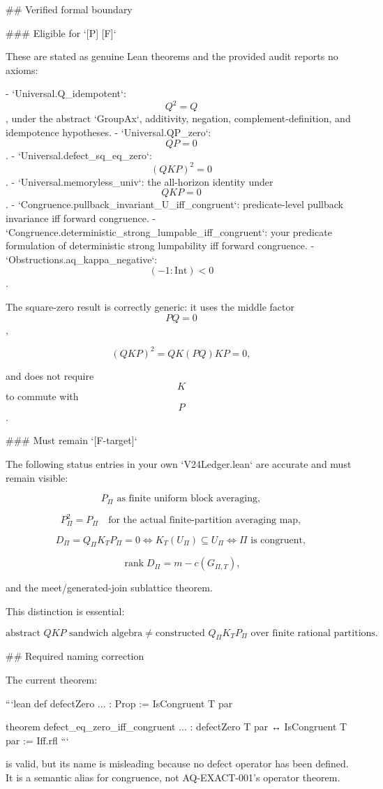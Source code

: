 ## Verified formal boundary

### Eligible for `[P] [F]`

These are stated as genuine Lean theorems and the provided audit reports no axioms:

- `Universal.Q_idempotent`: $$Q^2=Q$$, under the abstract `GroupAx`, additivity, negation, complement-definition, and idempotence hypotheses.
- `Universal.QP_zero`: $$QP=0$$.
- `Universal.defect_sq_eq_zero`: $$(QKP)^2=0$$.
- `Universal.memoryless_univ`: the all-horizon identity under $$QKP=0$$.
- `Congruence.pullback_invariant_U_iff_congruent`: predicate-level pullback invariance iff forward congruence.
- `Congruence.deterministic_strong_lumpable_iff_congruent`: your predicate formulation of deterministic strong lumpability iff forward congruence.
- `Obstructions.aq_kappa_negative`: $$(-1:\mathrm{Int})<0$$.

The square-zero result is correctly generic: it uses the middle factor $$PQ=0$$,

$$
(QKP)^2=QK(PQ)KP=0,
$$

and does not require $$K$$ to commute with $$P$$.

### Must remain `[F-target]`

The following status entries in your own `V24Ledger.lean` are accurate and must remain visible:

$$
P_\Pi\text{ as finite uniform block averaging},
$$

$$
P_\Pi^2=P_\Pi
\quad\text{for the actual finite-partition averaging map},
$$

$$
D_\Pi=Q_\Pi K_TP_\Pi=0
\iff
K_T(U_\Pi)\subseteq U_\Pi
\iff
\Pi\text{ is congruent},
$$

$$
\operatorname{rank}D_\Pi=m-c(G_{\Pi,T}),
$$

and the meet/generated-join sublattice theorem.

This distinction is essential:

$$
\text{abstract }QKP\text{ sandwich algebra}
\ne
\text{constructed }Q_\Pi K_TP_\Pi\text{ over finite rational partitions}.
$$

## Required naming correction

The current theorem:

```lean
def defectZero ... : Prop := IsCongruent T par

theorem defect_eq_zero_iff_congruent ... :
    defectZero T par ↔ IsCongruent T par := Iff.rfl
```

is valid, but its name is misleading because no defect operator has been defined. It is a semantic alias for congruence, not AQ-EXACT-001’s operator theorem.

